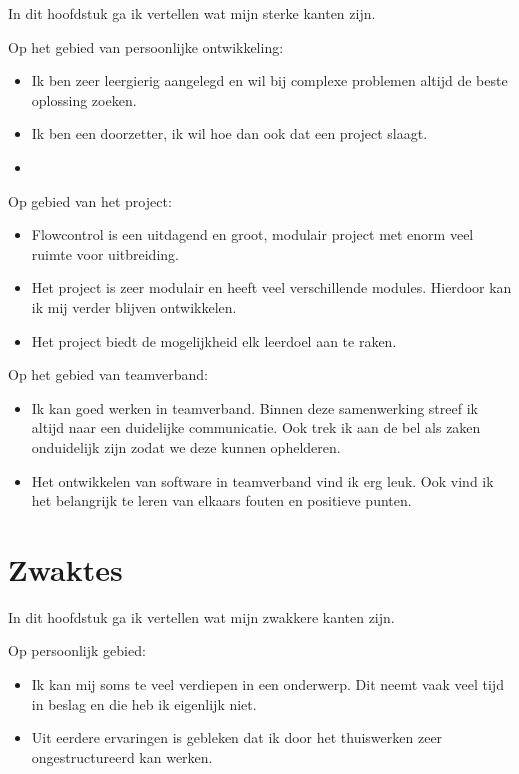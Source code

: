 \documentclass[11pt, twoside]{report}
\begin{document}
    In dit hoofdstuk ga ik vertellen wat mijn sterke kanten zijn.

    Op het gebied van persoonlijke ontwikkeling:
    \begin{itemize}
        \item[] Ik ben zeer leergierig aangelegd en wil bij complexe problemen altijd de beste oplossing zoeken.
        \item[] Ik ben een doorzetter, ik wil hoe dan ook dat een project slaagt.
        \item[]
    \end{itemize}

    Op gebied van het project:
    \begin{itemize}
        \item[] Flowcontrol is een uitdagend en groot, modulair project met enorm veel ruimte voor uitbreiding.
        \item[] Het project is zeer modulair en heeft veel verschillende modules. Hierdoor kan ik mij verder blijven ontwikkelen.
        \item[] Het project biedt de mogelijkheid elk leerdoel aan te raken.
    \end{itemize}

    Op het gebied van teamverband:
    \begin{itemize}
        \item[] Ik kan goed werken in teamverband. Binnen deze samenwerking streef ik altijd naar een duidelijke communicatie. Ook trek ik aan de bel als zaken onduidelijk zijn zodat we deze kunnen ophelderen.
        \item[] Het ontwikkelen van software in teamverband vind ik erg leuk. Ook vind ik het belangrijk te leren van elkaars fouten en positieve punten.
    \end{itemize}

    \section{Zwaktes}\label{sec:zwaktes}
    In dit hoofdstuk ga ik vertellen wat mijn zwakkere kanten zijn.

    Op persoonlijk gebied:
    \begin{itemize}
        \item[] Ik kan mij soms te veel verdiepen in een onderwerp. Dit neemt vaak veel tijd in beslag en die heb ik eigenlijk niet.
        \item[] Uit eerdere ervaringen is gebleken dat ik door het thuiswerken zeer ongestructureerd kan werken.
    \end{itemize}
\end{document}
